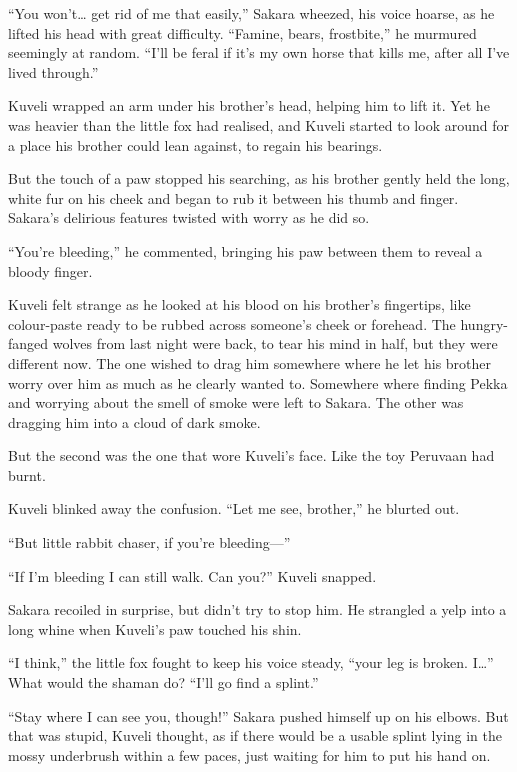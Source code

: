 ``You won't\ldots{} get rid of me that easily,'' Sakara wheezed, his voice hoarse, as he lifted his head with great difficulty. ``Famine, bears, frostbite,'' he murmured seemingly at random. ``I'll be feral if it's my own horse that kills me, after all I've lived through.''

Kuveli wrapped an arm under his brother's head, helping him to lift it. Yet he was heavier than the little fox had realised, and Kuveli started to look around for a place his brother could lean against, to regain his bearings.

But the touch of a paw stopped his searching, as his brother gently held the long, white fur on his cheek and began to rub it between his thumb and finger. Sakara's delirious features twisted with worry as he did so.

``You're bleeding,'' he commented, bringing his paw between them to reveal a bloody finger.

Kuveli felt strange as he looked at his blood on his brother's fingertips, like colour-paste ready to be rubbed across someone's cheek or forehead. The hungry-fanged wolves from last night were back, to tear his mind in half, but they were different now. The one wished to drag him somewhere where he let his brother worry over him as much as he clearly wanted to. Somewhere where finding Pekka and worrying about the smell of smoke were left to Sakara. The other was dragging him into a cloud of dark smoke.

But the second was the one that wore Kuveli's face. Like the toy Peruvaan had burnt.

Kuveli blinked away the confusion. ``Let me see, brother,'' he blurted out.

``But little rabbit chaser, if you're bleeding---''

``If I'm bleeding I can still walk. Can you?'' Kuveli snapped.

Sakara recoiled in surprise, but didn't try to stop him. He strangled a yelp into a long whine when Kuveli's paw touched his shin.

``I think,'' the little fox fought to keep his voice steady, ``your leg is broken. I\ldots'' What would the shaman do? ``I'll go find a splint.''

``Stay where I can see you, though!'' Sakara pushed himself up on his elbows. But that was stupid, Kuveli thought, as if there would be a usable splint lying in the mossy underbrush within a few paces, just waiting for him to put his hand on.

